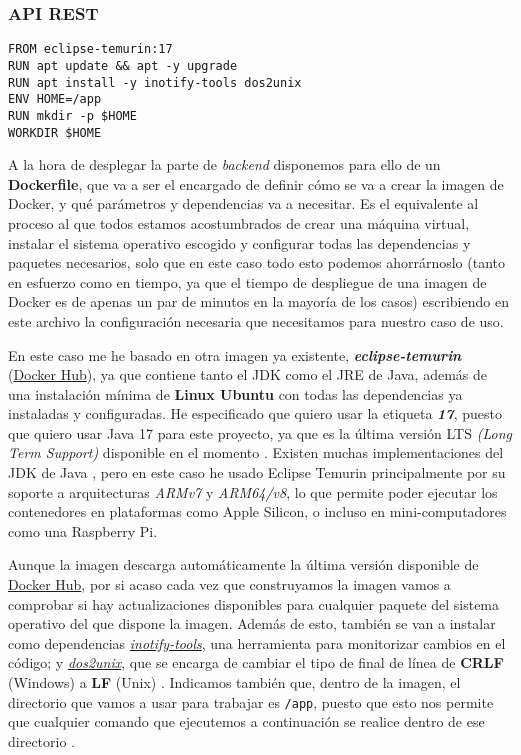 \subsubsection{API REST}

\begin{lstlisting}
FROM eclipse-temurin:17
RUN apt update && apt -y upgrade
RUN apt install -y inotify-tools dos2unix
ENV HOME=/app
RUN mkdir -p $HOME
WORKDIR $HOME
\end{lstlisting}

A la hora de desplegar la parte de \textit{backend} disponemos para ello de un \textbf{Dockerfile}, que va a ser el encargado de definir cómo se va a crear la imagen de Docker, y qué parámetros y dependencias va a necesitar. Es el equivalente al proceso al que todos estamos acostumbrados de crear una máquina virtual, instalar el sistema operativo escogido y configurar todas las dependencias y paquetes necesarios, solo que en este caso todo esto podemos ahorrárnoslo (tanto en esfuerzo como en tiempo, ya que el tiempo de despliegue de una imagen de Docker es de apenas un par de minutos en la mayoría de los casos) escribiendo en este archivo la configuración necesaria que necesitamos para nuestro caso de uso.

En este caso me he basado en otra imagen ya existente, \textit{\textbf{eclipse-temurin}} (\href{https://hub.docker.com/layers/library/eclipse-temurin/17/images/sha256-b0faf02bf7acfc65be1c2d0a291140300bd129620f145bf1013a1da748295d0c?context=explore}{Docker Hub}), ya que contiene tanto el JDK como el JRE de Java, además de una instalación mínima de \textbf{Linux Ubuntu} con todas las dependencias ya instaladas y configuradas. He especificado que quiero usar la etiqueta \textit{\textbf{17}}, puesto que quiero usar Java 17 para este proyecto, ya que es la última versión LTS \textit{(Long Term Support)} disponible en el momento \cite{java:releases}. Existen muchas implementaciones del JDK de Java \cite{foojay:java-jdks}, pero en este caso he usado Eclipse Temurin principalmente por su soporte a arquitecturas \textit{ARMv7} y \textit{ARM64/v8}, lo que permite poder ejecutar los contenedores en plataformas como Apple Silicon, o incluso en mini-computadores como una Raspberry Pi.

Aunque la imagen descarga automáticamente la última versión disponible de \href{https://hub.docker.com/layers/library/eclipse-temurin/17/images/sha256-b0faf02bf7acfc65be1c2d0a291140300bd129620f145bf1013a1da748295d0c?context=explore}{Docker Hub}, por si acaso cada vez que construyamos la imagen vamos a comprobar si hay actualizaciones disponibles para cualquier paquete del sistema operativo del que dispone la imagen. Además de esto, también se van a instalar como dependencias \textit{\href{https://github.com/inotify-tools}{inotify-tools}}, una herramienta para monitorizar cambios en el código; y \textit{\href{https://dos2unix.sourceforge.io/}{dos2unix}}, que se encarga de cambiar el tipo de final de línea de \textbf{CRLF} (Windows) a \textbf{LF} (Unix) \cite{medium:spring-boot-in-docker}. Indicamos también que, dentro de la imagen, el directorio que vamos a usar para trabajar es \verb,/app,, puesto que esto nos permite que cualquier comando que ejecutemos a continuación se realice dentro de ese directorio \cite{docker:workdir}.

